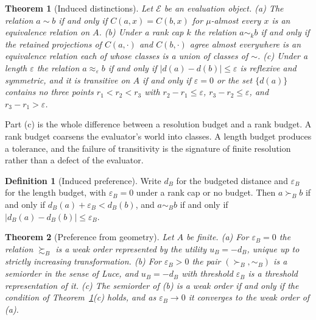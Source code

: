 \documentclass{article}
\newtheorem{theorem}{Theorem}
\theoremstyle{definition}
\newtheorem{definition}{Definition}
\theoremstyle{remark}
\newcommand{\Ev}{\mathcal{E}}
\begin{document}
\begin{theorem}[Induced distinctions]
\label{thm:dist}
Let $\Ev$ be an evaluation object.
(a) The relation $a\sim b$ if and only if $C(a,x)=C(b,x)$ for $\mu$-almost every $x$ is an equivalence relation on $A$.
(b) Under a rank cap $k$ the relation $a\sim_{k}b$ if and only if the retained projections of $C(a,\cdot)$ and $C(b,\cdot)$ agree almost everywhere is an equivalence relation each of whose classes is a union of classes of $\sim$.
(c) Under a length $\varepsilon$ the relation $a\approx_{\varepsilon}b$ if and only if $|d(a)-d(b)|\le\varepsilon$ is reflexive and symmetric, and it is transitive on $A$ if and only if $\varepsilon=0$ or the set $\{d(a)\}$ contains no three points $r_{1}<r_{2}<r_{3}$ with $r_{2}-r_{1}\le\varepsilon$, $r_{3}-r_{2}\le\varepsilon$, and $r_{3}-r_{1}>\varepsilon$.
\end{theorem}

Part (c) is the whole difference between a resolution budget and a rank budget.
A rank budget coarsens the evaluator's world into classes.
A length budget produces a tolerance, and the failure of transitivity is the signature of finite resolution rather than a defect of the evaluator.

\begin{definition}[Induced preference]
\label{def:pref}
Write $d_{B}$ for the budgeted distance and $\varepsilon_{B}$ for the length budget, with $\varepsilon_{B}=0$ under a rank cap or no budget.
Then $a\succ_{B}b$ if and only if $d_{B}(a)+\varepsilon_{B}<d_{B}(b)$, and $a\sim_{B}b$ if and only if $|d_{B}(a)-d_{B}(b)|\le\varepsilon_{B}$.
\end{definition}

\begin{theorem}[Preference from geometry]
\label{thm:pref}
Let $A$ be finite.
(a) For $\varepsilon_{B}=0$ the relation $\succsim_{B}$ is a weak order represented by the utility $u_{B}=-d_{B}$, unique up to strictly increasing transformation.
(b) For $\varepsilon_{B}>0$ the pair $(\succ_{B},\sim_{B})$ is a semiorder in the sense of Luce, and $u_{B}=-d_{B}$ with threshold $\varepsilon_{B}$ is a threshold representation of it.
(c) The semiorder of (b) is a weak order if and only if the condition of Theorem~\ref{thm:dist}(c) holds, and as $\varepsilon_{B}\to0$ it converges to the weak order of (a).
\end{theorem}
\end{document}
